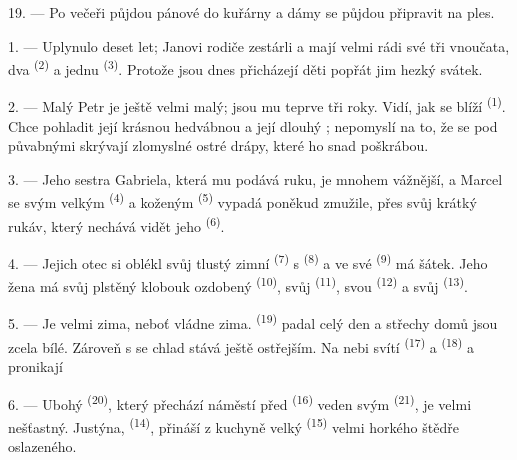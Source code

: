 19. --- Po večeři půjdou pánové do kuřárny a dámy se půjdou připravit na ples.

\VUsaut{5.0mm}
\VUsaut{1.6mm}
\VUsaut{2.6mm}

\VUsaut{3.0mm}

1. --- Uplynulo deset let; Janovi rodiče zestárli a mají velmi rádi své tři vnoučata,
dva  \textsuperscript{(2)} a jednu 
\textsuperscript{(3)}. Protože jsou dnes  přicházejí děti
popřát jim hezký svátek.

2. --- Malý Petr je ještě velmi malý; jsou mu teprve tři roky. Vidí, jak se blíží
 \textsuperscript{(1)}. Chce pohladit její krásnou hedvábnou
 a její dlouhý ; nepomyslí na to, že se pod půvabnými
 skrývají zlomyslné ostré drápy, které ho snad poškrábou.

3. --- Jeho sestra Gabriela, která mu podává ruku, je mnohem vážnější, a Marcel se svým
velkým  \textsuperscript{(4)} a koženým 
\textsuperscript{(5)} vypadá poněkud zmužile, přes svůj krátký rukáv, který nechává
vidět jeho  \textsuperscript{(6)}.

4. --- Jejich otec si oblékl svůj tlustý zimní 
\textsuperscript{(7)} s  \textsuperscript{(8)} a ve své
 \textsuperscript{(9)} má šátek. Jeho žena má svůj plstěný klobouk
ozdobený  \textsuperscript{(10)}, svůj 
\textsuperscript{(11)}, svou  \textsuperscript{(12)} a svůj
 \textsuperscript{(13)}.

5. --- Je velmi zima, neboť vládne zima.  \textsuperscript{(19)} padal
celý den a střechy domů jsou zcela bílé. Zároveň s  se chlad stává ještě
ostřejším. Na nebi svítí  \textsuperscript{(17)} a 
\textsuperscript{(18)} a pronikají 

\VUsaut{4.2mm}
\VUsaut{3.0mm}

6. --- Ubohý  \textsuperscript{(20)}, který přechází náměstí před
 \textsuperscript{(16)} veden svým 
\textsuperscript{(21)}, je velmi nešťastný. Justýna, 
\textsuperscript{(14)}, přináší z kuchyně velký 
\textsuperscript{(15)} velmi horkého  štědře oslazeného.

